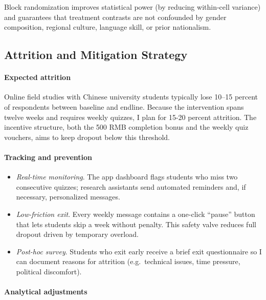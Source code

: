 \documentclass[12pt, american]{article}
\begin{document}
Block randomization improves statistical power (by reducing within‐cell variance) and guarantees that treatment contrasts are not confounded by gender composition, regional culture, language skill, or prior nationalism.

\subsection{Attrition and Mitigation Strategy}

\paragraph{Expected attrition}

Online field studies with Chinese university students typically lose 10–15 percent of respondents between baseline and endline.  Because the intervention spans twelve weeks and requires weekly quizzes, I plan for 15-20 percent attrition.  The incentive structure, both the 500 RMB completion bonus and the weekly quiz vouchers, aims to keep dropout below this threshold.

\paragraph{Tracking and prevention}

\begin{itemize}
    \item \textit{Real-time monitoring}.  The app dashboard flags students who miss two consecutive quizzes; research assistants send automated reminders and, if necessary, personalized messages.
    \item \textit{Low-friction exit}.  Every weekly message contains a one-click “pause” button that lets students skip a week without penalty.  This safety valve reduces full dropout driven by temporary overload.
    \item \textit{Post-hoc survey}.  Students who exit early receive a brief exit questionnaire so I can document reasons for attrition (e.g.\ technical issues, time pressure, political discomfort).
\end{itemize}

\paragraph{Analytical adjustments}
\end{document}
